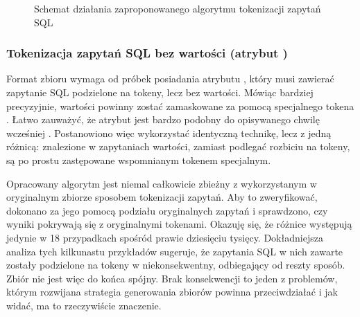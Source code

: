 \begin{figure}[ht!]
  \centering
  
  \caption{Schemat działania zaproponowanego algorytmu tokenizacji zapytań SQL}
  \label{fig:query-tokenization}
\end{figure}

\subsubsection{Tokenizacja zapytań SQL bez wartości (atrybut )}
Format zbioru  wymaga od próbek posiadania atrybutu , który musi zawierać zapytanie SQL podzielone na tokeny, lecz bez wartości. Mówiąc bardziej precyzyjnie, wartości powinny zostać zamaskowane za pomocą specjalnego tokena . Łatwo zauważyć, że atrybut  jest bardzo podobny do opisywanego chwilę wcześniej . Postanowiono więc wykorzystać identyczną technikę, lecz z jedną różnicą: znalezione w zapytaniach wartości, zamiast podlegać rozbiciu na tokeny, są po prostu zastępowane wspomnianym tokenem specjalnym. 

Opracowany algorytm jest niemal całkowicie zbieżny z wykorzystanym w oryginalnym zbiorze  sposobem tokenizacji zapytań. Aby to zweryfikować, dokonano za jego pomocą podziału oryginalnych zapytań i sprawdzono, czy wyniki pokrywają się z oryginalnymi tokenami. Okazuję się, że różnice występują jedynie w 18 przypadkach spośród prawie dziesięciu tysięcy. Dokładniejsza analiza tych kilkunastu przykładów sugeruje, że zapytania SQL w nich zawarte zostały podzielone na tokeny w niekonsekwentny, odbiegający od reszty sposób. Zbiór  nie jest więc do końca spójny. Brak konsekwencji to jeden z problemów, którym rozwijana strategia generowania zbiorów powinna przeciwdziałać i jak widać, ma to rzeczywiście znaczenie.

